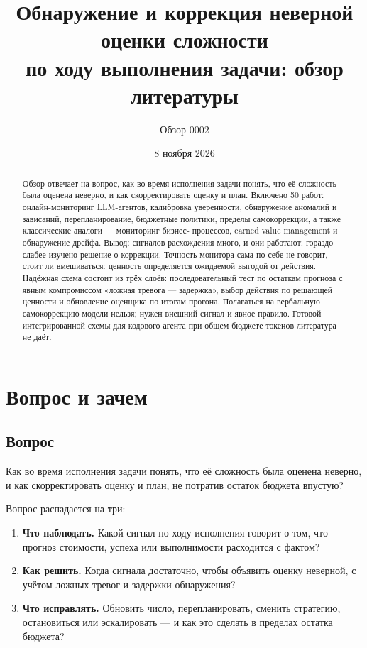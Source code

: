 \documentclass[11pt,a4paper]{article}
\title{Обнаружение и коррекция неверной оценки сложности\\
по ходу выполнения задачи: обзор литературы}
\author{Обзор 0002}
\date{8 ноября 2026}
\begin{document}
\maketitle

\begin{abstract}
\noindent
Обзор отвечает на вопрос, как во время исполнения задачи понять, что её
сложность была оценена неверно, и как скорректировать оценку и план.
Включено 50 работ: онлайн-мониторинг LLM-агентов, калибровка уверенности,
обнаружение аномалий и зависаний, перепланирование, бюджетные политики,
пределы самокоррекции, а также классические аналоги — мониторинг бизнес-
процессов, earned value management и обнаружение дрейфа. Вывод: сигналов
расхождения много, и они работают; гораздо слабее изучено решение о
коррекции. Точность монитора сама по себе не говорит, стоит ли вмешиваться:
ценность определяется ожидаемой выгодой от действия. Надёжная схема состоит
из трёх слоёв: последовательный тест по остаткам прогноза с явным
компромиссом «ложная тревога — задержка», выбор действия по решающей
ценности и обновление оценщика по итогам прогона. Полагаться на вербальную
самокоррекцию модели нельзя; нужен внешний сигнал и явное правило. Готовой
интегрированной схемы для кодового агента при общем бюджете токенов
литература не даёт.
\end{abstract}

\section{Вопрос и зачем}

\subsection{Вопрос}

Как во время исполнения задачи понять, что её сложность была оценена
неверно, и как скорректировать оценку и план, не потратив остаток бюджета
впустую?

Вопрос распадается на три:

\begin{enumerate}
  \item \textbf{Что наблюдать.} Какой сигнал по ходу исполнения говорит о
        том, что прогноз стоимости, успеха или выполнимости расходится с
        фактом?
  \item \textbf{Как решить.} Когда сигнала достаточно, чтобы объявить
        оценку неверной, с учётом ложных тревог и задержки обнаружения?
  \item \textbf{Что исправлять.} Обновить число, перепланировать, сменить
        стратегию, остановиться или эскалировать — и как это сделать в
        пределах остатка бюджета?
\end{enumerate}
\end{document}
